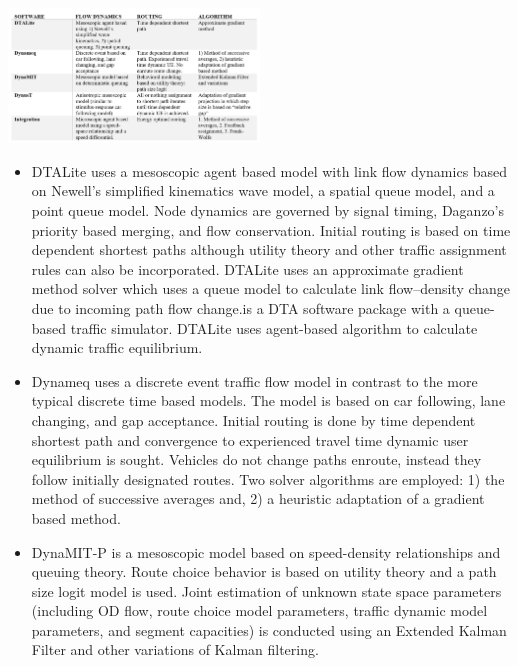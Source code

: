 \begin{table}
    \centering
    \includegraphics[width=0.5\textwidth]{figs/lit_table.PNG}
    \caption{}
    \label{tab:times}
\end{table}

\begin{itemize}
\item DTALite \cite{zhou2014dtalite} uses a mesoscopic agent based model with link flow dynamics based on Newell’s simplified kinematics wave model, a spatial queue model, and a point queue model. Node dynamics are governed by signal timing, Daganzo’s priority based merging, and flow conservation. Initial routing is based on time dependent shortest paths although utility theory and other traffic assignment rules can also be incorporated. DTALite uses an approximate gradient method solver which uses a queue model to calculate link flow–density change due to incoming path flow change.is a DTA software package with a queue-based traffic simulator. DTALite uses agent-based algorithm to calculate dynamic traffic equilibrium.
\item Dynameq uses a discrete event traffic flow model in contrast to the more typical discrete time based models. The model is based on car following, lane changing, and gap acceptance. Initial routing is done by time dependent shortest path and convergence to experienced travel time dynamic user equilibrium is sought. Vehicles do not change paths enroute, instead they follow initially designated routes. Two solver algorithms are employed: 1) the method of successive averages and, 2) a heuristic adaptation of a gradient based method.   
\item DynaMIT-P \cite{DynaMIT,ben2001dynamit} is a mesoscopic model based on speed-density relationships and queuing theory. Route choice behavior is based on utility theory and a path size logit model is used. Joint estimation of unknown state space parameters (including OD flow, route choice model parameters, traffic dynamic model parameters, and segment capacities) is conducted using an Extended Kalman Filter and other variations of Kalman filtering.   

\end{itemize}
